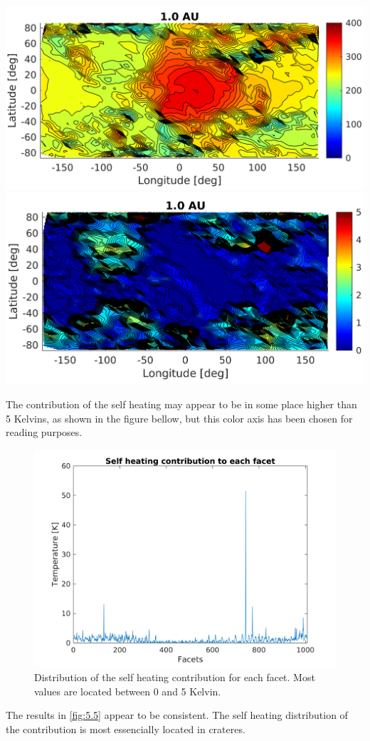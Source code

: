 \begin{center}
    \includegraphics[width=\linewidth]{rsc/self_2D.png}
    \includegraphics[width=\linewidth]{rsc/self_2D_diff.png}
    \label{fig:5.3}
\end{center}
The contribution of the self heating may appear to be in some place higher than 5 Kelvins, as shown in the figure bellow, but this color axis has been chosen for reading purposes.
\begin{figure}[H]
    \centering
    \includegraphics[width=\linewidth]{rsc/self_contribution.png}
    \caption{Distribution of the self heating contribution for each facet. Most values are located between 0 and 5 Kelvin.}
    \label{fig:5.4}
\end{figure}
The results in \autoref{fig:5.5} appear to be consistent. The self heating distribution of the contribution is most essencially located in crateres.
